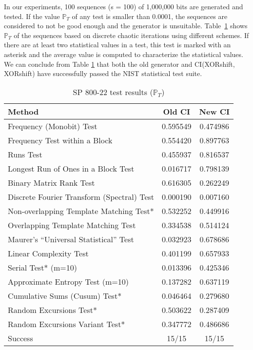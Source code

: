 \documentclass[10pt, a4paper, conference, compsocconf]{IEEEtran}
\begin{document}
In our experiments, 100 sequences (s = 100) of 1,000,000 bits are generated and tested. If the value $\mathbb{P}_T$ of any test is smaller than 0.0001, the sequences are considered to not be good enough and the generator is unsuitable. Table~\ref{The passing rate} shows $\mathbb{P}_T$ of the sequences based on discrete chaotic iterations using different schemes. If there are at least two statistical values in a test, this test is marked with an asterisk and the average value is computed to characterize the statistical values. 
We can conclude from Table \ref{The passing rate} that both the old generator and CI(XORshift, XORshift) have successfully passed the NIST statistical test suite.
\begin{table}[!t]
\renewcommand{\arraystretch}{1.3}
\caption{SP 800-22 test results ($\mathbb{P}_T$)}
\label{The passing rate}
\centering
  \begin{tabular}{|l||c|c|}
    \hline
Method & Old CI & New CI  \\ \hline\hline

Frequency (Monobit) Test 			&0.595549&0.474986 \\ \hline
Frequency Test within a Block  			&0.554420&0.897763  \\ \hline
Runs Test 					&0.455937&0.816537 \\ \hline
Longest Run of Ones in a Block Test 		&0.016717&0.798139   \\ \hline
Binary Matrix Rank Test 			&0.616305&0.262249  \\ \hline
Discrete Fourier Transform (Spectral) Test	&0.000190&0.007160   \\ \hline
Non-overlapping Template Matching Test* 	&0.532252&0.449916 \\ \hline
Overlapping Template Matching Test   		&0.334538&0.514124  \\ \hline
Maurer’s “Universal Statistical” Test   	&0.032923&0.678686  \\ \hline
Linear Complexity Test  			&0.401199&0.657933    \\ \hline
Serial Test* (m=10) 				&0.013396&0.425346  \\ \hline
Approximate Entropy Test (m=10) 		&0.137282&0.637119  \\ \hline
Cumulative Sums (Cusum) Test* 			&0.046464&0.279680\\ \hline
Random Excursions Test* 			&0.503622&0.287409   \\ \hline
Random Excursions Variant Test* 		&0.347772&0.486686    \\ \hline
Success & 15/15 & 15/15 \\ \hline
    \hline
  \end{tabular}
\end{table}
\end{document}
